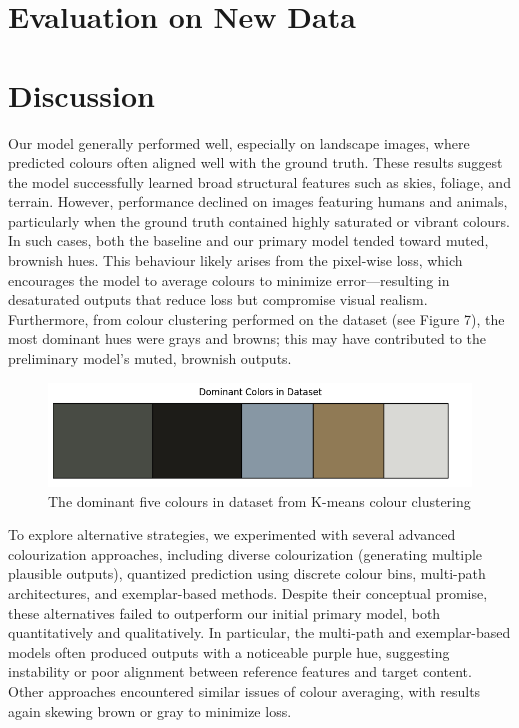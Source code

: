 \documentclass{article} %
\begin{document}
\section{Evaluation on New Data}
\label{new_data}

\section{Discussion}
\label{discussion}

Our model generally performed well, especially on landscape images, where predicted colours often aligned well with the ground truth. These results suggest the model successfully
learned broad structural features such as skies, foliage, and terrain. However, performance declined on images featuring humans and animals, particularly when the ground truth
contained highly saturated or vibrant colours. In such cases, both the baseline and our primary model tended toward muted, brownish hues. This behaviour likely arises from the
pixel-wise loss, which encourages the model to average colours to minimize error—resulting in desaturated outputs that reduce loss but compromise visual realism. Furthermore, from colour clustering performed on the dataset (see Figure 7), the most dominant hues were grays and browns; this may have contributed to the preliminary model's muted, brownish outputs. 

\begin{figure}[htbp]            %
  \centering
  \includegraphics[width=0.95\linewidth]{Figs/dom-colours.png}
  \caption{The dominant five colours in dataset from K-means colour clustering}
  \label{fig:dom-colours}
\end{figure}

To explore alternative strategies, we experimented with several advanced colourization approaches, including diverse colourization (generating multiple plausible outputs),
quantized prediction using discrete colour bins, multi-path architectures, and exemplar-based methods. Despite their conceptual promise, these alternatives failed to outperform
our initial primary model, both quantitatively and qualitatively. In particular, the multi-path and exemplar-based models often produced outputs with a noticeable purple hue, 
suggesting instability or poor alignment between reference features and target content. 
Other approaches encountered similar issues of colour averaging, with results again skewing 
brown or gray to minimize loss.
\end{document}
